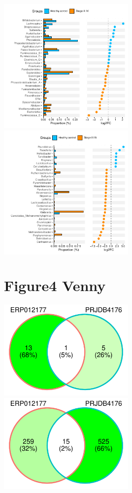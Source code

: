 \documentclass[
]{article}
\begin{document}
\includegraphics[width=0.5\textwidth,height=0.5\textheight]{../../Analysis_shotgun_PRJDB4176/04_Wilcoxon/atlas/output/class_PRJDB4176_pvalue0.05Stage.III.IV._Healthy.control_metagenomics.pdf}
\includegraphics[width=0.5\textwidth,height=0.5\textheight]{../../Analysis_shotgun_PRJDB4176/04_Wilcoxon/Kraken2/output/class_PRJDB4176_pvalue0.05Stage.III.IV._Healthy.control_metagenomics.pdf}

\hypertarget{figure4-venny}{%
\section{Figure4 Venny}\label{figure4-venny}}

\includegraphics[width=0.5\textwidth,height=0.5\textheight]{../../Venny/Atlas_wilcox_venny.pdf}
\includegraphics[width=0.5\textwidth,height=0.5\textheight]{../../Venny/Kraken2_wilcox_venny.pdf}
\end{document}
